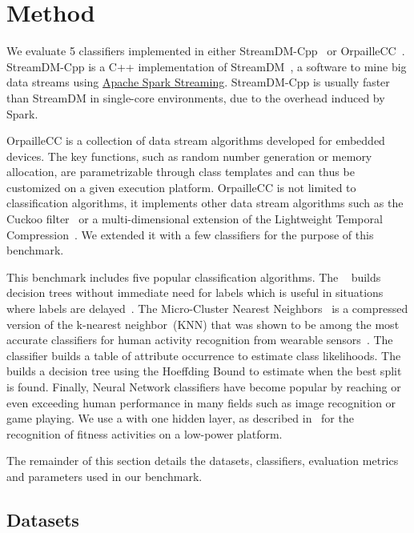 \section{Method}
We evaluate 5 classifiers implemented in either
StreamDM-Cpp~\cite{StreamDM-CPP} or
OrpailleCC~\cite{OrpailleCC}.  StreamDM-Cpp is a
C++ implementation of StreamDM~\cite{StreamDM}, a
software to mine big data streams using
\href{https://spark.apache.org/streaming/}{Apache
Spark Streaming}. StreamDM-Cpp is usually faster
than StreamDM in single-core environments, due to the
overhead induced by Spark.

OrpailleCC is a collection of data stream
algorithms developed for embedded devices. The key
functions, such as random number generation or
memory allocation, are parametrizable through
class templates and can thus be customized on a
given execution platform.  OrpailleCC is not
limited to classification algorithms, it
implements other data stream algorithms such as
the Cuckoo filter~\cite{cuckoo} or a
multi-dimensional extension of the Lightweight
Temporal Compression~\cite{multi-ltc}. We extended
it with a few classifiers for the purpose of this
benchmark.

This benchmark includes five popular classification
algorithms.  The
\mondrianforest~\cite{mondrian2014} builds
decision trees without immediate need for labels
which is useful in situations where labels are
delayed~\cite{stream_learning_review}.  The
Micro-Cluster Nearest
Neighbors~\cite{mc-nn} is a compressed version of the k-nearest
neighbor~(KNN) that was shown to be among the most accurate classifiers for human activity
recognition from wearable sensors~\cite{Janidarmian_2017}. The \naivebayes~\cite{naive_bayes}
classifier builds a table of attribute
occurrence to estimate class
likelihoods.
The \hoeffdingtree~\cite{VFDT} builds a
decision tree using the Hoeffding Bound to
estimate when the best split is found. 
Finally, Neural Network classifiers have
become popular by reaching or even exceeding human performance in many fields such as image
recognition or game playing. We use a
\FNN with one hidden layer, as described in~\cite{omid_2019} for the recognition 
of fitness activities on a low-power platform.

The remainder of this section details the datasets, classifiers,
evaluation metrics and parameters used in our benchmark.

\subsection{Datasets}
\label{sec:method-dataset}
